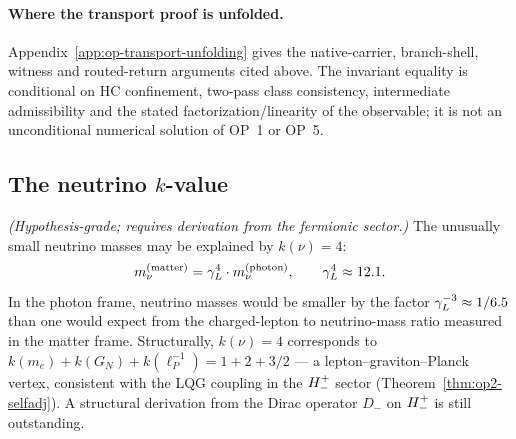 \paragraph{Where the transport proof is unfolded.}
Appendix~\ref{app:op-transport-unfolding} gives the native-carrier,
branch-shell, witness and routed-return arguments cited above.
The invariant equality is conditional on HC confinement, two-pass
class consistency, intermediate admissibility and the stated
factorization/linearity of the observable; it is not an unconditional
numerical solution of OP~1 or OP~5.

\subsection[The neutrino k-value]{The neutrino \texorpdfstring{$k$}{k}-value}

\begin{proposition}[$k(\nu) = 4$ as hypothesis, hypothesis-grade]
\label{prop:k-neutrino}
\emph{(Hypothesis-grade; requires derivation from the fermionic sector.)}
The unusually small neutrino masses may be explained by $k(\nu) = 4$:
\[
  m_\nu^{(\mathrm{matter})} = \gamma_L^4 \cdot m_\nu^{(\mathrm{photon})},
  \qquad \gamma_L^4 \approx 12.1.
\]
In the photon frame, neutrino masses would be smaller by the factor
$\gamma_L^{-3} \approx 1/6.5$ than one would expect from the charged-lepton to
neutrino-mass ratio measured in the matter frame.
Structurally, $k(\nu) = 4$ corresponds to
$k(m_e)+k(G_N)+k(\ell_P^{-1}) = 1+2+3/2$ --- a lepton--graviton--Planck
vertex, consistent with the LQG coupling in the $H^+_-$ sector
(Theorem~\ref{thm:op2-selfadj}).
A structural derivation from the Dirac operator $D_-$ on $H^+_-$
is still outstanding.
\end{proposition}

